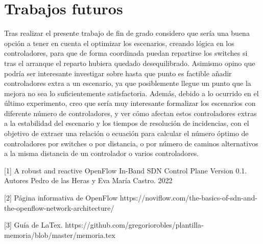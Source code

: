 \documentclass[a4paper, 12pt]{book}
\begin{document}
	
	\section{Trabajos futuros}
	\label{sec:trabajos_futuros}
	
	Tras realizar el presente trabajo de fin de grado considero que sería una buena opción a tener en cuenta el optimizar los escenarios, creando lógica en los controladores, para que de forma coordinada puedan repartirse los switches si tras el arranque el reparto hubiera quedado desequilibrado. Asimismo opino que podría ser interesante investigar sobre hasta que punto es factible añadir controladores extra a un escenario, ya que posiblemente llegue un punto que la mejora no sea lo suficientemente satisfactoria. 
	Además, debido a lo ocurrido en el último experimento, creo que sería muy interesante formalizar los escenarios con diferente número de controladores, y ver cómo afectan estos controladores extras a la estabilidad del escenario y los tiempos de resolución de incidencias, con el objetivo de extraer una relación o ecuación para calcular el número óptimo de controladores por switches o por distancia, o por número de caminos alternativos a la misma distancia de un controlador o varios controladores.
	
	
	
	\cleardoublepage
	
	
	\cleardoublepage
	
	
	 
	
	[1]  A robust and reactive
	OpenFlow In-Band SDN Control Plane
	Version 0.1. Autores Pedro de las Heras y Eva María Castro. 2022
	
	[2]  Página informativa de OpenFlow https://noviflow.com/the-basics-of-sdn-and-the-openflow-network-architecture/ 
		
	[3]  Guía de LaTex.  https://github.com/gregoriorobles/plantilla-memoria/blob/master/memoria.tex
	
\end{document}
